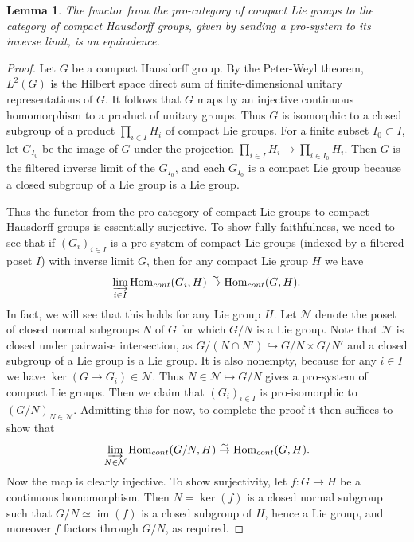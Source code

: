 \documentclass[12pt]{article}
\newtheorem{lemma}[theorem]{Lemma}
\theoremstyle{definition}
\newcommand{\on}{\operatorname}
\newcommand{\mc}{\mathcal}
\begin{document}
\begin{lemma}
The functor from the pro-category of compact Lie groups to the category of compact Hausdorff groups, given by sending a pro-system to its inverse limit, is an equivalence.
\end{lemma}
\begin{proof}
Let $G$ be a compact Hausdorff group.  By the Peter-Weyl theorem, $L^2(G)$ is the Hilbert space direct sum of finite-dimensional unitary representations of $G$.  It follows that $G$ maps by an injective continuous homomorphism to a product of unitary groups.  Thus $G$ is isomorphic to a closed subgroup of a product $\prod_{i\in I}H_i$ of compact Lie groups.  For a finite subset $I_0\subset I$, let $G_{I_0}$ be the image of $G$ under the projection $\prod_{i\in I}H_i \to \prod_{i\in I_0}H_i$.  Then $G$ is the filtered inverse limit of the $G_{I_0}$, and each $G_{I_0}$ is a compact Lie group because a closed subgroup of a Lie group is a Lie group.

Thus the functor from the pro-category of compact Lie groups to compact Hausdorff groups is essentially surjective.  To show fully faithfulness, we need to see that if $(G_i)_{i\in I}$ is a pro-system of compact Lie groups (indexed by a filtered poset $I$) with inverse limit $G$, then for any compact Lie group $H$ we have
$$\varinjlim_{i\in I}\on{Hom}_{cont}(G_i,H)\overset{\sim}{\rightarrow}\on{Hom}_{cont}(G,H).$$
In fact, we will see that this holds for any Lie group $H$.  Let $\mc{N}$ denote the poset of closed normal subgroups $N$ of $G$ for which $G/N$ is a Lie group.  Note that $\mc{N}$ is closed under pairwaise intersection, as $G/(N\cap N')\hookrightarrow G/N\times G/N'$ and a closed subgroup of a Lie group is a Lie group.  It is also nonempty, because for any $i\in I$ we have $\on{ker}(G\to G_i)\in\mc{N}$.   Thus $N\in\mc{N} \mapsto G/N$ gives a pro-system of compact Lie groups.  Then we claim that $(G_i)_{i\in I}$ is pro-isomorphic to $(G/N)_{N\in\mc{N}}$.  Admitting this for now, to complete the proof it then suffices to show that
$$\varinjlim_{N\in\mc{N}}\on{Hom}_{cont}(G/N,H)\overset{\sim}{\rightarrow} \on{Hom}_{cont}(G,H).$$
Now the map is clearly injective.  To show surjectivity, let $f:G\to H$ be a continuous homomorphism.  Then $N=\on{ker}(f)$ is a closed normal subgroup such that $G/N\simeq\on{im}(f)$ is a closed subgroup of $H$, hence a Lie group, and moreover $f$ factors through $G/N$, as required.


\end{proof}
\end{document}
